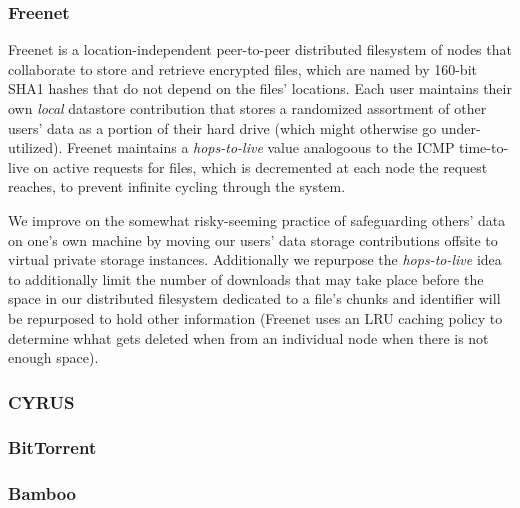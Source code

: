 \subsubsection*{Freenet}

Freenet is a location-independent peer-to-peer distributed filesystem of nodes that collaborate to store and retrieve encrypted files,
which are named by 160-bit SHA1 hashes that do not depend on the files' locations. Each user maintains their own \textit{local} datastore
contribution that stores a randomized assortment of other users' data as a portion of their hard drive (which might otherwise go
under-utilized). Freenet maintains a \textit{hops-to-live} value analogoous to
the ICMP time-to-live on active requests for files, which is decremented at each node the request reaches, to prevent infinite cycling
through the system.

We improve on the somewhat risky-seeming practice of safeguarding others' data on one's own machine by moving our
users' data storage contributions offsite to virtual private storage instances.
Additionally we repurpose the \textit{hops-to-live} idea to additionally limit the number of
downloads that may take place before the space in our distributed filesystem dedicated to a file's chunks and identifier will be
repurposed to hold other information (Freenet uses an LRU caching policy to determine whhat gets deleted when from an individual node
when there is not enough space).

\subsubsection*{CYRUS} %

\subsubsection*{BitTorrent} %

\subsubsection*{Bamboo} %

